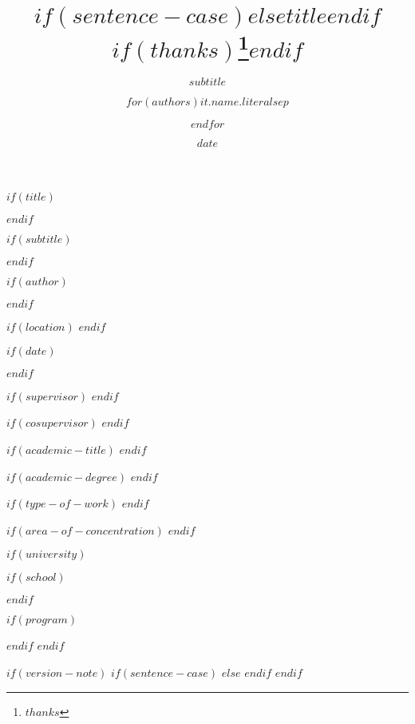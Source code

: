 $if(title)$
\title{
$if(sentence-case)$$else$$title$$endif$
$if(thanks)$\thanks{$thanks$}$endif$
}

$endif$

$if(subtitle)$
\subtitle{$subtitle$}
$endif$

$if(author)$
\author{$for(authors)$$it.name.literal$$sep$ \and $endfor$}
$endif$

$if(location)$
$endif$

$if(date)$
\date{$date$}
$endif$

$if(supervisor)$
$endif$

$if(cosupervisor)$
$endif$

$if(academic-title)$
$endif$

$if(academic-degree)$
$endif$

$if(type-of-work)$
$endif$

$if(area-of-concentration)$
$endif$

$if(university)$

$if(school)$

$endif$

$if(program)$

$endif$
$endif$

$if(version-note)$
$if(sentence-case)$
$else$
$endif$
$endif$
